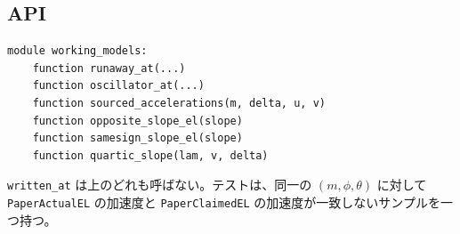 \subsection{API}

\begin{verbatim}
module working_models:
    function runaway_at(...)
    function oscillator_at(...)
    function sourced_accelerations(m, delta, u, v)
    function opposite_slope_el(slope)
    function samesign_slope_el(slope)
    function quartic_slope(lam, v, delta)
\end{verbatim}

\texttt{written\_at} は上のどれも呼ばない。テストは、同一の \((m,\phi,\theta)\) に対して \texttt{PaperActualEL} の加速度と \texttt{PaperClaimedEL} の加速度が一致しないサンプルを一つ持つ。
